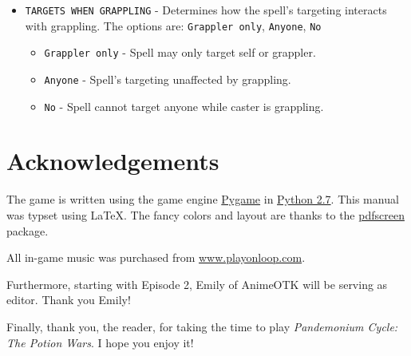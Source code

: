 \documentclass{report}
\begin{document}
\begin{itemize}
    \item \verb|TARGETS WHEN GRAPPLING| - Determines how the spell's targeting
    interacts with grappling. The options are: \verb|Grappler only|, \verb|Anyone|,
    \verb|No|
    \begin{itemize}
        \item \verb|Grappler only| - Spell may only target self or grappler.
        \item \verb|Anyone| - Spell's targeting unaffected by grappling.
        \item \verb|No| - Spell cannot target anyone while caster is grappling.
    \end{itemize}
\end{itemize}

\chapter{Acknowledgements}

The game is written using the game engine \href{www.pygame.org}{Pygame} in \href{www.python.org}{Python 2.7}. This manual was typset using \LaTeX. The fancy colors and 
layout are thanks to the \href{texcatalogue.ctan.org/entries/pdfscreen.html}{pdfscreen} package.

All in-game music was purchased from \url{www.playonloop.com}.

Furthermore, starting with Episode 2, Emily of AnimeOTK will be serving as editor. Thank you Emily!

Finally, thank you, the reader, for taking the time to play \textit{Pandemonium Cycle: The Potion Wars}. I hope you enjoy it! 
\end{document}
